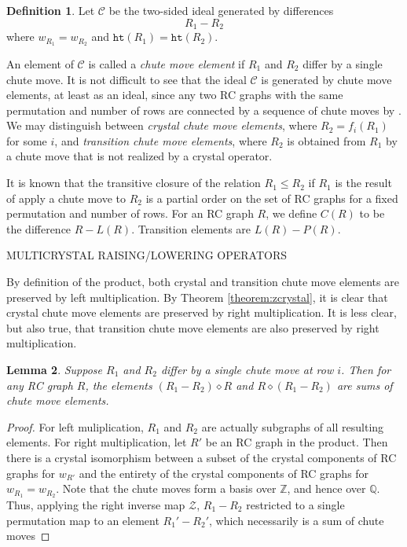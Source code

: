 \documentclass{amsart}
\newtheorem{lemma}{Lemma}[subsection]
\newtheorem{proposition}[lemma]{Proposition}
\theoremstyle{definition}
\newtheorem{definition}[lemma]{Definition}
\theoremstyle{remark}
\numberwithin{equation}{subsection}
\newcommand{\wof}[1]{w_{#1}}
\newcommand{\zeromap}{\mathcal{Z}}
\newcommand{\hr}{\mathtt{ht}}
\begin{document}
\begin{definition}
Let $\mathcal{C}$ be the two-sided ideal generated by differences
$$R_1 - R_2$$
where $\wof{R_1}=\wof{R_2}$ and $\hr(R_1)=\hr(R_2)$. 

An element of $\mathcal{C}$ is called a \emph{chute move element} if $R_1$ and $R_2$ differ by a single chute move. It is not difficult to see that the ideal $\mathcal{C}$ is generated by chute move elements, at least as an ideal, since any two RC graphs with the same permutation and number of rows are connected by a sequence of chute moves by \cite[Theorem~3.7]{bbrc}. We may distinguish between \emph{crystal chute move elements}, where $R_2=f_i(R_1)$ for some $i$, and \emph{transition chute move elements}, where $R_2$ is obtained from $R_1$ by a chute move that is not realized by a crystal operator. 

\end{definition}

It is known that the transitive closure of the relation $R_1\leq R_2$ if $R_1$ is the result of apply a chute move to $R_2$ is a partial order on the set of RC graphs for a fixed permutation and number of rows. For an RC graph $R$, we define $C(R)$ to be the difference $R - L(R)$. Transition elements are $L(R) - P(R)$.

MULTICRYSTAL RAISING/LOWERING OPERATORS


By definition of the product, both crystal and transition chute move elements are preserved by left multiplication. By Theorem \ref{theorem:zcrystal}, it is clear that crystal chute move elements are preserved by right multiplication. It is less clear, but also true, that transition chute move elements are also preserved by right multiplication. 

\begin{lemma}
Suppose $R_1$ and $R_2$ differ by a single chute move at row $i$. Then for any RC graph $R$, the elements $(R_1 - R_2)\diamond R$ and $R\diamond (R_1 - R_2)$ are sums of chute move elements.
\end{lemma}
\begin{proof}
For left muliplication, $R_1$ and $R_2$ are actually subgraphs of all resulting elements. For right multiplication, let $R'$ be an RC graph in the product. Then there is a crystal isomorphism between a subset of the crystal components of RC graphs for $\wof{R'}$ and the entirety of the crystal components of RC graphs for $\wof{R_1}=\wof{R_2}$. Note that the chute moves form a basis over $\mathbb{Z}$, and hence over $\mathbb{Q}$. Thus, applying the right inverse map $\zeromap$, $R_1 - R_2$ restricted to a single permutation map to an element $R_1' - R_2'$, which necessarily is a sum of chute moves
\end{proof}
\end{document}

